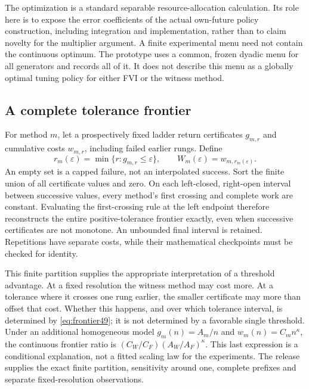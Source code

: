 The optimization is a standard separable resource-allocation calculation. Its role here is to expose the error coefficients of the actual own-future policy construction, including integration and implementation, rather than to claim novelty for the multiplier argument. A finite experimental menu need not contain the continuous optimum. The prototype uses a common, frozen dyadic menu for all generators and records all of it. It does not describe this menu as a globally optimal tuning policy for either FVI or the witness method.

\subsection{A complete tolerance frontier}
For method $m$, let a prospectively fixed ladder return certificates $g_{m,r}$ and cumulative costs $w_{m,r}$, including failed earlier rungs. Define
\begin{equation}\label{eq:frontier49}
 r_m(\varepsilon)=\min\{r:g_{m,r}\le\varepsilon\},\qquad
 W_m(\varepsilon)=w_{m,r_m(\varepsilon)}.
\end{equation}
An empty set is a capped failure, not an interpolated success. Sort the finite union of all certificate values and zero. On each left-closed, right-open interval between successive values, every method's first crossing and complete work are constant. Evaluating the first-crossing rule at the left endpoint therefore reconstructs the entire positive-tolerance frontier exactly, even when successive certificates are not monotone. An unbounded final interval is retained. Repetitions have separate costs, while their mathematical checkpoints must be checked for identity.

This finite partition supplies the appropriate interpretation of a threshold advantage. At a fixed resolution the witness method may cost more. At a tolerance where it crosses one rung earlier, the smaller certificate may more than offset that cost. Whether this happens, and over which tolerance interval, is determined by \eqref{eq:frontier49}; it is not determined by a favorable single threshold. Under an additional homogeneous model $g_m(n)=A_m/n$ and $w_m(n)=C_m n^\kappa$, the continuous frontier ratio is $(C_W/C_F)(A_W/A_F)^\kappa$. This last expression is a conditional explanation, not a fitted scaling law for the experiments. The release supplies the exact finite partition, sensitivity around one, complete prefixes and separate fixed-resolution observations.
